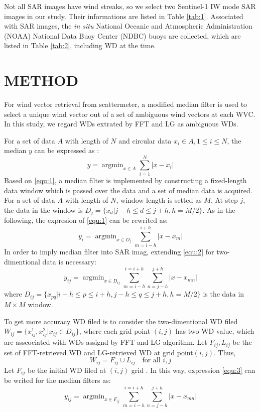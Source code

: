 \documentclass{article}
\begin{document}
Not all SAR images have wind streaks, so we select two Sentinel-1 IW mode SAR images in our study. Their informations are listed in Table \ref{tab:1}. Associated with SAR images, the {\it in situ} National Oceanic and Atmospheric Administration (NOAA) National Data Buoy Center (NDBC) buoys are collected, which are listed in Table \ref{tab:2}, including WD at the time.

\section{METHOD}
\label{sec:method}
For wind vector retrieval from scattermeter, a modified median filter is used to select a unique wind vector out of a set of ambiguous wind vectors at each WVC. In this study, we regard WDs extrated by FFT and LG as ambiguous WDs.

For a set of data $A$ with length of $N$ and circular data $x_i\in A,1 \le i \le N$, the median $y$ can be expressed as :
\begin{equation}
y = \mathop{\arg\min}_{x \in A}\sum_{i=1}^N|x - x_i|
\label{equ:1}
\end{equation}
Based on \ref{equ:1}, a median filter is implemented by constructing a fixed-length data window which is passed over the data and a set of median data is acquired. For a set of data $A$ with length of $N$, window length is setted as $M$. At step $j$, the data in the window is $D_j=\{x_d|j-h\le d \le j+h, h=M/2\}$. As in the following, the expresion of \ref{equ:1} can be rewrited as:
\begin{equation}
y_i  = \mathop{\arg\min}_{x\in D_j}\sum_{m=i-h}^{i+h}|x-x_m|
\label{equ:2}
\end{equation}
In order to imply median filter into SAR imag, extending \ref{equ:2} for two-dimentional data is necessary:
\begin{equation}
y_{ij} = \mathop{\arg\min}_{x\in D_{ij}}\sum_{m=i-h}^{i=i+h}\sum_{n=j-h}^{j+h}|x-x_{mn}|
\label{equ:3}
\end{equation}
where $D_{ij} = \{x_{pq} | i-h\le p \le i+h, j-h\le q \le j+h , h = M/2\}$ is the data in $M \times M$ window.

To get more accuracy WD filed is to consider the two-dimentional WD filed $W_{ij}=\{x_{ij}^1, x_{ij}^2|x_{ij}\in D_{ij}\}$, where each grid point $(i, j)$ has two WD value, which are asscociated with WDs assignd by FFT and LG algorithm. Let $F_{ij},L_{ij}$ be the set of FFT-retrieved WD and LG-retrieved WD at grid point$(i, j)$. Thus, 
\begin{equation}
W_{ij} = F_{ij}\cup L_{ij}\quad \text{for all } i, j
\label{equ:4}
\end{equation}
 Let $F_{ij}$ be the initial WD filed at $(i, j)$ grid . In this way, expression \ref{equ:3} can be writed for the median filters as:
\begin{equation}
y_{ij} = \mathop{\arg\min}_{x\in F_{ij}}\sum_{m=i-h}^{i=i+h}\sum_{n=j-h}^{j+h}|x-x_{mn}|
\label{equ:5}
\end{equation}
\end{document}
